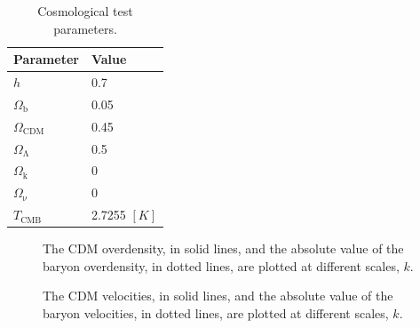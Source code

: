 \documentclass{aa}
\begin{document}
\begin{table}[h!] %
     \caption{Cosmological test parameters.} %
     \label{tab:test_parameters}
     \begin{tabular}{l|l}%
       \textbf{Parameter} & \textbf{Value}\\%
       \hline %
       $h$ & 0.7\\
       $\Omega_\mathrm{b}$ & 0.05\\
       $\Omega_\mathrm{CDM}$& 0.45\\
       $\Omega_\mathrm{\Lambda}$ & 0.5\\
       $\Omega_\mathrm{k}  $     & 0\\
       $\Omega_\mathrm{\nu}$ & 0\\
       $T_\mathrm{CMB}$ & 2.7255 $[K]$\\
       \hline
     \end{tabular}
 \end{table}

\begin{figure}[h!]
   \caption{The CDM overdensity, in solid lines, and the absolute value of the baryon overdensity,
    in dotted lines, are plotted at different scales, $k$.}\label{fig:test1}
\end{figure}

\begin{figure}[h!]
   \caption{The CDM velocities, in solid lines, and the absolute value of the baryon velocities,
    in dotted lines, are plotted at different scales, $k$.}\label{fig:test2}
\end{figure}
\end{document}
